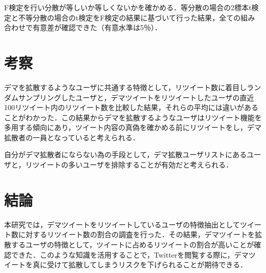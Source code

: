 \documentclass[uplatex,twocolumn,dvipdfmx]{jsarticle}
\begin{document}
F検定を行い分散が等しいか等しくないかを確かめる．等分散の場合の2標本t検定と不等分散の場合のt検定をF検定の結果に基づいて行った結果，全ての組み合わせで有意差が確認できた（有意水準は5％）．

\section{考察}
デマを拡散するようなユーザに共通する特徴として，リツイート数に着目しランダムサンプリングしたユーザと，デマツイートをリツイートしたユーザの直近100リツイート内のリツイート数を比較した結果，それらの平均には違いがあることがわかった．この結果からデマを拡散するようなユーザはリツイート機能を多用する傾向にあり，ツイート内容の真偽を確かめる前にリツイートをし，デマ拡散者の一員となっていると考えられる．

自分がデマ拡散者にならない為の手段として，デマ拡散ユーザリストにあるユーザと，リツイートの多いユーザを排除することが有効だと考えられる．

\section{結論}
本研究では，デマツイートをリツイートしているユーザの特徴抽出としてツイート数に対するリツイート数の割合の調査を行った．その結果，デマツイートを拡散するユーザの特徴として，ツイートに占めるリツイートの割合が高いことが確認できた．このような知識を活用することで，Twitterを閲覧する際に，デマツイートを真に受けて拡散してしまうリスクを下げられることが期待できる．


\end{document}
